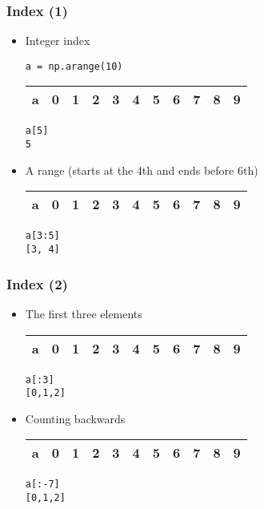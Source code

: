 \documentclass{beamer}
\begin{document}
\begin{frame}[fragile]
\frametitle{Index (1)}
\begin{itemize}
\item Integer index

\begin{lstlisting}
a = np.arange(10)
\end{lstlisting}

\begin{table}[t]
\centering
\begin{tabular}{|l|c|c|c|c|c|c|c|c|c|c|}
\hline
a & 0 & 1 & 2 & 3 & 4 & \cellcolor{red}5 & 6 & 7 & 8 & 9 \\
\hline
\end{tabular}
\end{table}

\begin{lstlisting}
a[5]
5
\end{lstlisting}

\item A range (starts at the 4th and ends before 6th)
\begin{table}[t]
\centering
\begin{tabular}{|l|c|c|c|c|c|c|c|c|c|c|}
\hline
a & 0 & 1 & 2 &\cellcolor{red} 3 &\cellcolor{red} 4 & 5 & 6 & 7 & 8 & 9 \\
\hline
\end{tabular}
\end{table}

\begin{lstlisting}
a[3:5]
[3, 4]
\end{lstlisting}
\end{itemize}
\end{frame}

\begin{frame}[fragile]
\frametitle{Index (2)}
\begin{itemize}
\item The first three elements
\begin{table}[t]
\centering
\begin{tabular}{|l|c|c|c|c|c|c|c|c|c|c|}
\hline
a &\cellcolor{red} 0 &\cellcolor{red} 1 &\cellcolor{red} 2 & 3 & 4 & 5 & 6 & 7 & 8 & 9 \\
\hline
\end{tabular}
\end{table}
\begin{lstlisting}
a[:3]
[0,1,2]
\end{lstlisting}
\item Counting backwards
\begin{table}[t]
\centering
\begin{tabular}{|l|c|c|c|c|c|c|c|c|c|c|}
\hline
a &\cellcolor{red} 0 &\cellcolor{red} 1 &\cellcolor{red} 2 & 3 & 4 & 5 & 6 & 7 & 8 & 9 \\
\hline
\end{tabular}
\end{table}
\begin{lstlisting}
a[:-7]
[0,1,2]
\end{lstlisting}
\end{itemize}
\end{frame}
\end{document}
